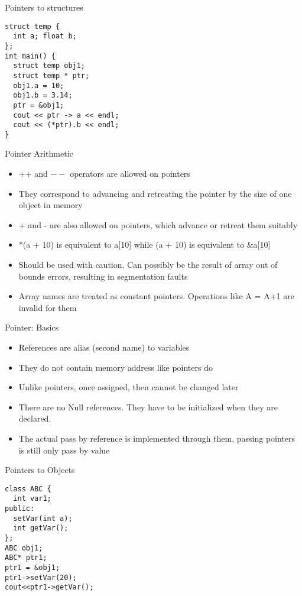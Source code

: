\documentclass{beamer}
\begin{document}
\begin{frame}[fragile]{Pointers to structures}
  \begin{lstlisting}
struct temp {
  int a; float b;
};
int main() {
  struct temp obj1;
  struct temp * ptr;
  obj1.a = 10;
  obj1.b = 3.14;
  ptr = &obj1;
  cout << ptr -> a << endl;
  cout << (*ptr).b << endl;
}
  \end{lstlisting}
\end{frame}

\begin{frame}[fragile]{Pointer Arithmetic}
  \begin{itemize}
    \item ++ and $--$ operators are allowed on pointers\pause
    \item They correspond to advancing and retreating the pointer by the size of one object in memory\pause
    \item + and - are also allowed on pointers, which advance or retreat them suitably\pause
    \item *(a + 10) is equivalent to a[10] while (a + 10) is equivalent to \&a[10]\pause
    \item Should be used with caution. Can possibly be the result of array out of bounds errors, resulting in segmentation faults\pause
    \item Array names are treated as constant pointers. Operations like A = A+1 are invalid for them
  \end{itemize}
\end{frame}

\begin{frame}[fragile]{Pointer: Basics}
  \begin{itemize}
    \item References are alias (second name) to variables\pause
    \item They do not contain memory address like pointers do\pause
    \item Unlike pointers, once assigned, then cannot be changed later\pause
    \item There are no Null references. They have to be initialized when they are declared.\pause
    \item The actual pass by reference is implemented through them, passing pointers is still only pass by value
  \end{itemize}
\end{frame}

\begin{frame}[fragile]{Pointers to Objects}
  \begin{lstlisting}
class ABC {
  int var1;
public:
  setVar(int a);
  int getVar();
};
ABC obj1;
ABC* ptr1;
ptr1 = &obj1;
ptr1->setVar(20);
cout<<ptr1->getVar();
  \end{lstlisting}
\end{frame}
\end{document}
